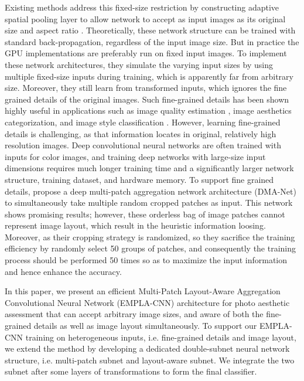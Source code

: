 \documentclass[10pt,twocolumn,letterpaper]{article}
\begin{document}
Existing methods address this fixed-size restriction by constructing
adaptive spatial pooling layer to allow network to accept as input images 
as its original size and aspect ratio \cite{SPP} \cite{cvpr:2016}.
Theoretically, these network structure can be trained with standard
back-propagation, regardless of the input image size. But in practice the 
GPU implementations are preferably run on fixed input images. To implement 
these network architectures, they simulate the varying input sizes by using 
multiple fixed-size inputs during training, which is apparently 
far from arbitrary size. Moreover, they still learn from 
transformed inputs, which ignores the fine grained details of the 
original images.
Such fine-grained details has been shown highly
useful in applications such as image quality estimation 
\cite{Kang:2014:CNN:2679600.2680212},
image aesthetics categorization, and image style classification
\cite{Lu:2014:ACMMM}. However, learning fine-grained details is 
challenging, as that information locates in original, relatively 
high resolution images. Deep convolutional neural networks are 
often trained with inputs for color images, and training deep 
networks with large-size input dimensions requires much longer 
training time and a significantly larger network structure, training
dataset, and hardware memory. To support fine grained details, 
\cite{Lu:ICCV } propose a deep multi-patch aggregation network architecture 
(DMA-Net) to simultaneously take multiple random cropped patches
as input. This network shows promising results; however, these orderless
bag of image patches cannot represent image layout, which result in the 
heuristic information loosing. Moreover, as their cropping strategy is 
randomized, so they sacrifice the training efficiency by randomly select 
50 groups of patches, and consequently the training process should be 
performed 50 times so as to maximize the input information and hence enhance 
the accuracy.

In this paper, we present an efficient Multi-Patch Layout-Aware Aggregation 
Convolutional Neural Network (EMPLA-CNN) architecture for photo aesthetic
assessment that can accept arbitrary image sizes, and aware 
of both the fine-grained details as well as image layout simultaneously.
To support our EMPLA-CNN training on heterogeneous inputs, i.e.
fine-grained details and image layout, we extend the method by developing 
a dedicated double-subnet neural network structure, i.e. multi-patch subnet
and layout-aware subnet. We integrate the two subnet after some layers of 
transformations to form the final classifier.
\end{document}
